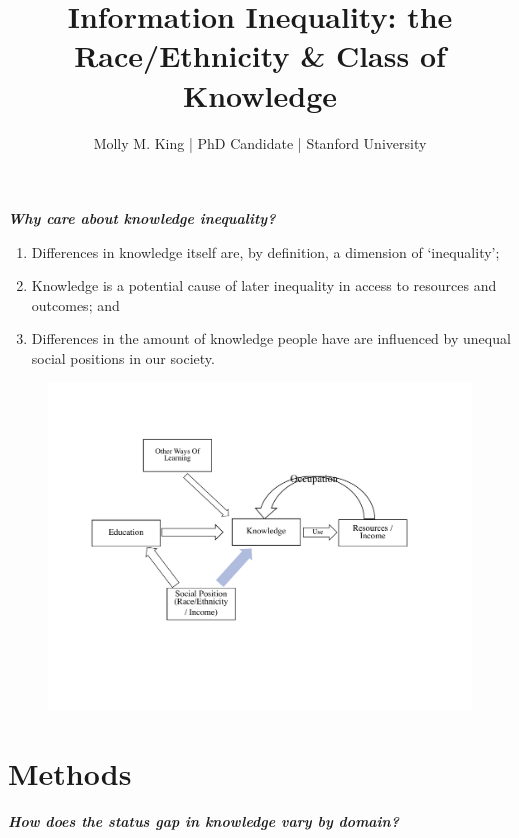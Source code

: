 \documentclass[]{article}
\begin{document}
 \title{\vspace{-1.0cm}Information Inequality: the Race/Ethnicity \& Class of Knowledge}
 \date{}
 \author{Molly M. King  |  PhD Candidate  |  Stanford University}

 \maketitle
\thispagestyle{fancy}

\emph{\textbf{Why care about knowledge inequality?}}

\begin{enumerate}
  \item{Differences in knowledge itself are, by definition, a dimension of `inequality';}
  \item{Knowledge is a potential cause of later inequality in access to resources and outcomes; and}
  \item{Differences in the amount of knowledge people have are influenced by unequal social positions in our society.}
\end{enumerate}


    \begin{figure}[htb]
      \begin{center}
      \includegraphics[width=0.7\linewidth]{"Theoretical Model Drawing"}
      \end{center}
    \end{figure}


\section{Methods}\label{methods}

\emph{\textbf{How does the status gap in knowledge vary by domain?}}

\vspace{7mm}
\end{document}
